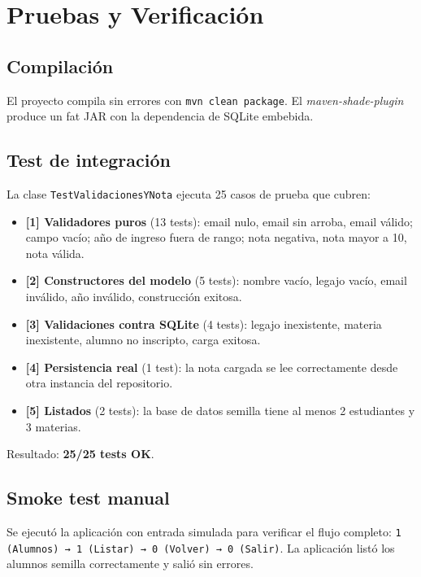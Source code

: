 \documentclass[12pt,a4paper]{article}
\begin{document}
\section{Pruebas y Verificación}

\subsection{Compilación}

El proyecto compila sin errores con \texttt{mvn clean package}. El
\emph{maven-shade-plugin} produce un fat JAR con la dependencia de SQLite
embebida.

\subsection{Test de integración}

La clase \texttt{TestValidacionesYNota} ejecuta 25 casos de prueba que
cubren:

\begin{itemize}
    \item \textbf{[1] Validadores puros} (13 tests): email nulo, email sin
        arroba, email válido; campo vacío; año de ingreso fuera de rango;
        nota negativa, nota mayor a 10, nota válida.
    \item \textbf{[2] Constructores del modelo} (5 tests): nombre vacío,
        legajo vacío, email inválido, año inválido, construcción exitosa.
    \item \textbf{[3] Validaciones contra SQLite} (4 tests): legajo
        inexistente, materia inexistente, alumno no inscripto, carga
        exitosa.
    \item \textbf{[4] Persistencia real} (1 test): la nota cargada se lee
        correctamente desde otra instancia del repositorio.
    \item \textbf{[5] Listados} (2 tests): la base de datos semilla tiene
        al menos 2 estudiantes y 3 materias.
\end{itemize}

Resultado: \textbf{25/25 tests OK}.

\subsection{Smoke test manual}

Se ejecutó la aplicación con entrada simulada para verificar el flujo
completo: \texttt{1 (Alumnos) → 1 (Listar) → 0 (Volver) → 0 (Salir)}.
La aplicación listó los alumnos semilla correctamente y salió sin errores.
\end{document}
